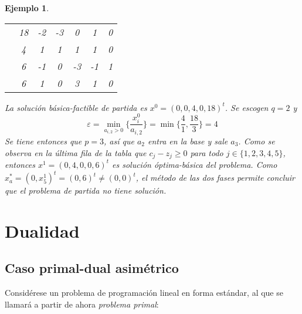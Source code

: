 \documentclass[11pt]{report}
\theoremstyle{mytheorem}
\theoremstyle{mydefinition}
\theoremstyle{myexample}
\newtheorem*{example}{Ejemplo}
\begin{document}
\begin{example}
\begin{center}
\begin{tabular}{|c|c|c|c|c|c|c|}
    \multicolumn{1}{c|}{} & 18 & \multicolumn{1}{c}{-2} & \multicolumn{1}{c}{-3} & \multicolumn{1}{c}{\phantom{-}0} & \multicolumn{1}{c}{\phantom{-}1} & \multicolumn{1}{c|}{0} \\ \hhline{~|=|=|=|=|=|=|}
    
    \multicolumn{1}{c|}{} & 4 & \multicolumn{1}{c}{\phantom{-}1} & \multicolumn{1}{c}{\phantom{-}1} & \multicolumn{1}{c}{\phantom{-}1} & \multicolumn{1}{c}{\phantom{-}1}& \multicolumn{1}{c|}{0}  \\
    
    \multicolumn{1}{c|}{} & 6 & \multicolumn{1}{c}{-1} & \multicolumn{1}{c}{\phantom{-}0} & \multicolumn{1}{c}{-3} & \multicolumn{1}{c}{-1}& \multicolumn{1}{c|}{1}  \\ \cline{2-7}
    
    \multicolumn{1}{c|}{} & 6 & \multicolumn{1}{c}{\phantom{-}1} & \multicolumn{1}{c}{\phantom{-}0} & \multicolumn{1}{c}{\phantom{-}3} & \multicolumn{1}{c}{\phantom{-}1} & \multicolumn{1}{c|}{0} \\ \cline{2-7}
\end{tabular}
\end{center}
La solución básica-factible de partida es $x^0 =(0,0,4,0,18)^t$. Se escogen $q = 2$ y
\[\varepsilon = \min_{a_{i,2}>0} \biggl\{\frac{x_i^0}{a_{i,2}}\biggr\} = \min \biggl\{\frac{4}{1},\frac{18}{3} \biggr\} = 4\]
Se tiene entonces que $p = 3$, así que $a_2$ entra en la base y sale $a_3$. Como se observa en la última fila de la tabla que $c_j-z_j \geq 0$ para todo $j \in \{1,2,3,4,5\}$, entonces $x^1 = (0,4,0,0,6)^t$ es solución óptima-básica del problema. Como $x_a^* = (0,x^1_5)^t = (0,6)^t \neq (0,0)^t$, el método de las dos fases permite concluir  que el problema de partida no tiene solución.
\end{example}

\chapter{Dualidad}

\section{Caso primal-dual asimétrico}

Considérese un problema de programación lineal en forma estándar, al que se llamará a partir de ahora {\textit{problema primal}}:
\end{document}
